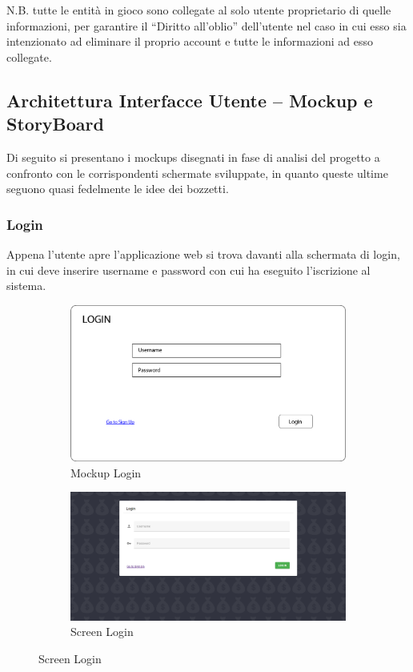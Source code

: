 \documentclass{report}
\begin{document}
N.B. tutte le entità in gioco sono collegate al solo utente proprietario di quelle informazioni, per garantire il “Diritto all’oblio” dell’utente nel caso in cui esso sia intenzionato ad eliminare il proprio account e tutte le informazioni ad esso collegate.

\subsection{Architettura Interfacce Utente – Mockup e StoryBoard}
Di seguito si presentano i mockups disegnati in fase di analisi del progetto a confronto con le corrispondenti schermate sviluppate, in quanto queste ultime seguono quasi fedelmente le idee dei bozzetti.

\subsubsection{Login}
Appena l’utente apre l’applicazione web si trova davanti alla schermata di login, in cui deve inserire username e password con cui ha eseguito l’iscrizione al sistema.
\begin{figure}[H]
    \begin{subfigure}
        \centering
        \includegraphics[scale=0.3]{images/mockups/Login.png}
        \caption{Mockup Login}
    \end{subfigure}
    \par\bigskip
    \begin{subfigure}
        \centering
        \includegraphics[scale=0.35]{images/screens/Login.png}
        \caption{Screen Login}
    \end{subfigure}
\end{figure}
\end{document}
